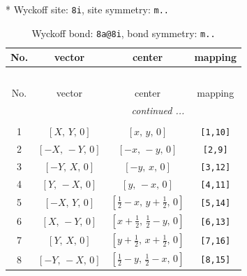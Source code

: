 \documentclass[fleqn,8pt]{jsarticle}
\begin{document}
* Wyckoff site: {\tt 8i}, site symmetry: {\tt m..}
\renewcommand{\arraystretch}{1.2}
\begin{longtable}{cccc}
\caption{Wyckoff bond: {\tt 8a@8i}, bond symmetry: {\tt m..}}
 \\
 \hline \hline
No. & vector & center & mapping \\ \hline \endfirsthead

\multicolumn{3}{l}{\tablename\ \thetable{}} \\
 \hline \hline
No. & vector & center & mapping \\ \hline \endhead

 \hline \hline
\multicolumn{3}{r}{\footnotesize\it continued ...} \\ \endfoot

 \hline \hline
\multicolumn{3}{r}{} \\ \endlastfoot

1 & $\left[ X,\, Y,\, 0 \right]$ & $\left[ x,\, y,\, 0 \right]$ & {\tt [1,10]} \\ \hline
2 & $\left[ - X,\, - Y,\, 0 \right]$ & $\left[ - x,\, - y,\, 0 \right]$ & {\tt [2,9]} \\ \hline
3 & $\left[ - Y,\, X,\, 0 \right]$ & $\left[ - y,\, x,\, 0 \right]$ & {\tt [3,12]} \\ \hline
4 & $\left[ Y,\, - X,\, 0 \right]$ & $\left[ y,\, - x,\, 0 \right]$ & {\tt [4,11]} \\ \hline
5 & $\left[ - X,\, Y,\, 0 \right]$ & $\left[ \frac{1}{2} - x,\, y + \frac{1}{2},\, 0 \right]$ & {\tt [5,14]} \\ \hline
6 & $\left[ X,\, - Y,\, 0 \right]$ & $\left[ x + \frac{1}{2},\, \frac{1}{2} - y,\, 0 \right]$ & {\tt [6,13]} \\ \hline
7 & $\left[ Y,\, X,\, 0 \right]$ & $\left[ y + \frac{1}{2},\, x + \frac{1}{2},\, 0 \right]$ & {\tt [7,16]} \\ \hline
8 & $\left[ - Y,\, - X,\, 0 \right]$ & $\left[ \frac{1}{2} - y,\, \frac{1}{2} - x,\, 0 \right]$ & {\tt [8,15]} \\
\end{longtable}
\renewcommand{\arraystretch}{1.2}
\end{document}
